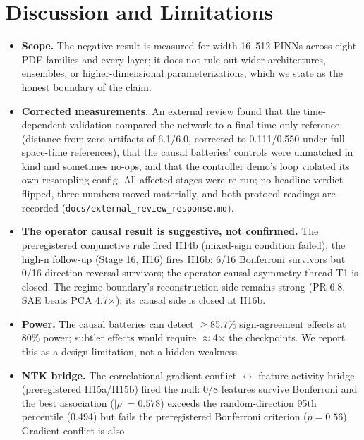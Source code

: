 \documentclass{article}
\begin{document}
\section{Discussion and Limitations}
\label{sec:discussion}

\begin{itemize}
  \item \textbf{Scope.} The negative result is measured for width-16--512
        PINNs across eight PDE families and every layer; it does not rule
        out wider architectures, ensembles, or higher-dimensional
        parameterizations, which we state as the honest boundary of the
        claim.
  \item \textbf{Corrected measurements.} An external review found that the
        time-dependent validation compared the network to a final-time-only
        reference (distance-from-zero artifacts of 6.1/6.0, corrected to
        0.111/0.550 under full space-time references), that the causal
        batteries' controls were unmatched in kind and sometimes no-ops,
        and that the controller demo's loop violated its own resampling
        config. All affected stages were re-run; no headline verdict
        flipped, three numbers moved materially, and both protocol
        readings are recorded (\texttt{docs/external\_review\_response.md}).
  \item \textbf{The operator causal result is suggestive, not confirmed.}
        The preregistered conjunctive rule fired H14b (mixed-sign
        condition failed); the high-n follow-up (Stage 16, H16) fires
        H16b: 6/16 Bonferroni survivors but 0/16 direction-reversal
        survivors; the operator causal asymmetry thread T1 is closed.
        The regime boundary's reconstruction side remains strong (PR 6.8,
        SAE beats PCA 4.7$\times$); its causal side is closed at H16b.
  \item \textbf{Power.} The causal batteries can detect $\ge$85.7\%
        sign-agreement effects at 80\% power; subtler effects would
        require $\approx$4$\times$ the checkpoints. We report this as a
        design limitation, not a hidden weakness.
  \item \textbf{NTK bridge.} The correlational gradient-conflict
        $\leftrightarrow$ feature-activity bridge (preregistered H15a/H15b)
        fired the null: 0/8 features survive Bonferroni and the best
        association ($|\rho| = 0.578$) exceeds the random-direction
        95th percentile (0.494) but fails the preregistered Bonferroni
        criterion ($p = 0.56$). Gradient conflict is also

\end{itemize}
\end{document}

